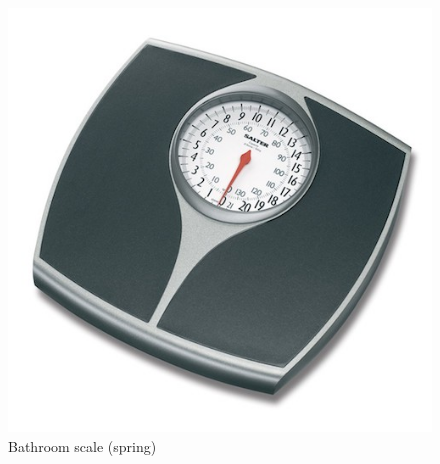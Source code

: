 \documentclass[
  12pt,
]{book}
\begin{document}
\begin{figure}

{\centering \includegraphics[width=6.94in]{images/springScale} 

}

\caption{Bathroom scale (spring)}\label{fig:weight1}
\end{figure}
\end{document}
